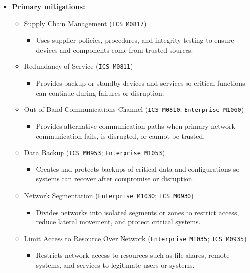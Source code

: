 \documentclass[10pt,a4paper,oneside]{report}
\begin{document}
\begin{itemize}
\item \textbf{Primary mitigations:}
\begin{itemize}
\item Supply Chain Management (\texttt{ICS M0817})
\begin{itemize}
\item Uses supplier policies, procedures, and integrity testing to ensure devices and components come from trusted sources.
\end{itemize}
\item Redundancy of Service (\texttt{ICS M0811})
\begin{itemize}
\item Provides backup or standby devices and services so critical functions can continue during failures or disruption.
\end{itemize}
\item Out-of-Band Communications Channel (\texttt{ICS M0810}; \texttt{Enterprise M1060})
\begin{itemize}
\item Provides alternative communication paths when primary network communication fails, is disrupted, or cannot be trusted.
\end{itemize}
\item Data Backup (\texttt{ICS M0953}; \texttt{Enterprise M1053})
\begin{itemize}
\item Creates and protects backups of critical data and configurations so systems can recover after compromise or disruption.
\end{itemize}
\item Network Segmentation (\texttt{Enterprise M1030}; \texttt{ICS M0930})
\begin{itemize}
\item Divides networks into isolated segments or zones to restrict access, reduce lateral movement, and protect critical systems.
\end{itemize}
\item Limit Access to Resource Over Network (\texttt{Enterprise M1035}; \texttt{ICS M0935})
\begin{itemize}
\item Restricts network access to resources such as file shares, remote systems, and services to legitimate users or systems.
\end{itemize}
\end{itemize}
\end{itemize}
\end{document}
